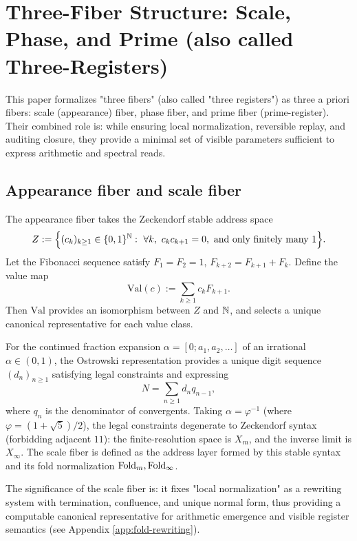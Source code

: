 \section{Three-Fiber Structure: Scale, Phase, and Prime (also called Three-Registers)}

This paper formalizes "three fibers" (also called "three registers") as three a priori fibers: scale (appearance) fiber, phase fiber, and prime fiber (prime-register). Their combined role is: while ensuring local normalization, reversible replay, and auditing closure, they provide a minimal set of visible parameters sufficient to express arithmetic and spectral reads.\par

\subsection{Appearance fiber and scale fiber}
\begin{definition}\label{def:Z-fiber}
The appearance fiber takes the Zeckendorf stable address space
$$
Z := \Bigl\{(c_k)_{k\ge 1}\in\{0,1\}^{\NN}:\ \forall k,\ c_kc_{k+1}=0,\ \text{and only finitely many }1\Bigr\}.
$$
Let the Fibonacci sequence satisfy $F_1=F_2=1$, $F_{k+2}=F_{k+1}+F_k$. Define the value map
$$
\mathrm{Val}(c) := \sum_{k\ge 1} c_k F_{k+1}.
$$
Then $\mathrm{Val}$ provides an isomorphism between $Z$ and $\mathbb{N}$, and selects a unique canonical representative for each value class.\par
\end{definition}

\begin{definition}\label{def:scale-fiber}
For the continued fraction expansion $\alpha=[0;a_1,a_2,\dots]$ of an irrational $\alpha\in(0,1)$, the Ostrowski representation \cite{Ostrowski1922} provides a unique digit sequence $(d_n)_{n\ge 1}$ satisfying legal constraints and expressing
$$
N=\sum_{n\ge 1} d_n q_{n-1},
$$
where $q_n$ is the denominator of convergents. Taking $\alpha=\varphi^{-1}$ (where $\varphi=(1+\sqrt{5})/2$), the legal constraints degenerate to Zeckendorf syntax (forbidding adjacent $11$): the finite-resolution space is $X_m$, and the inverse limit is $X_\infty$. The scale fiber is defined as the address layer formed by this stable syntax and its fold normalization $\mathrm{Fold}_m,\mathrm{Fold}_\infty$.\par
\end{definition}

The significance of the scale fiber is: it fixes "local normalization" as a rewriting system with termination, confluence, and unique normal form, thus providing a computable canonical representative for arithmetic emergence and visible register semantics (see Appendix \ref{app:fold-rewriting}).\par

